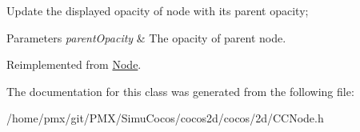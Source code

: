 Update the displayed opacity of node with it\textquotesingle{}s parent opacity; 
\begin{DoxyParams}{Parameters}
{\em parent\+Opacity} & The opacity of parent node. \\
\hline
\end{DoxyParams}


Reimplemented from \hyperlink{classNode_a3a0122884e7e1ce310b8b68abfbb245b}{Node}.



The documentation for this class was generated from the following file\+:\begin{DoxyCompactItemize}
\item 
/home/pmx/git/\+P\+M\+X/\+Simu\+Cocos/cocos2d/cocos/2d/C\+C\+Node.\+h\end{DoxyCompactItemize}
